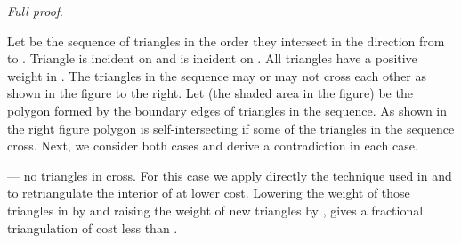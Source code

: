 \documentclass[final]{siamltex}
\newenvironment{fullproof}{\par{\it Full proof}. \ignorespaces}{\endproof}
\begin{document}
\begin{fullproof}
Let  be the sequence of triangles in the order they intersect 
 in the direction from  to . Triangle  is incident on  and  is incident on . 
All triangles have a positive weight in .
The triangles in the sequence may or may not cross each other as shown in the figure to the right.
Let  (the shaded area in the figure) be the polygon formed by the boundary edges of triangles in the sequence.
As shown in the right figure polygon  is self-intersecting if some of the triangles in the sequence cross.
Next, we consider both cases and derive a contradiction in each case.
\end{window}




 --- no triangles in  cross.  For this case we apply directly the technique used in 
\cite{keil1994computing} and \cite{cheng1996approaching} to retriangulate the interior of  at lower cost.
Lowering the weight of those triangles in  by 
and raising the weight of new triangles by ,
gives a fractional triangulation of cost less than .




\end{fullproof}
\end{document}
